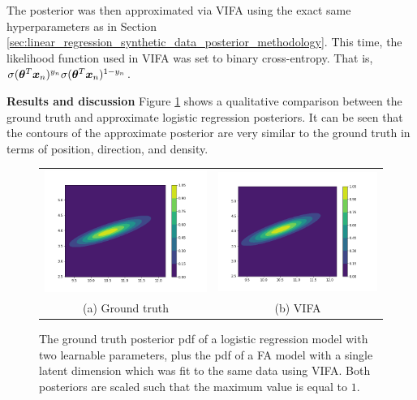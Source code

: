 \documentclass[10pt]{article} %
\begin{document}
The posterior was then approximated via VIFA using the exact same hyperparameters as in Section \ref{sec:linear_regression_synthetic_data_posterior_methodology}. This time, the likelihood function used in VIFA was set to binary cross-entropy. That is, $\sigma({\bm{\theta}}^T {\bm{x}}_n)^{y_n} \sigma({\bm{\theta}}^T {\bm{x}}_n)^{1 - y_n}$.


\textbf{Results and discussion} Figure \ref{fig:logistic_regression_synthetic_data_posterior} shows a qualitative comparison between the ground truth and approximate logistic regression posteriors. It can be seen that the contours of the approximate posterior are very similar to the ground truth in terms of position, direction, and density.
\begin{figure}[!htbp] 
\begin{center}
\begin{tabular}{cc}
	\includegraphics[width=70mm]{plots/logistic_regression_synthetic_true_posterior.png}
	& \includegraphics[width=70mm]{plots/logistic_regression_synthetic_vifa_posterior.png} \\
	(a) Ground truth
	& (b) VIFA \\[6pt]
\end{tabular}
\end{center}
\caption{The ground truth posterior pdf of a logistic regression model with two learnable parameters, plus the pdf of a FA model with a single latent dimension which was fit to the same data using VIFA. Both posteriors are scaled such that the maximum value is equal to $1$.}
\label{fig:logistic_regression_synthetic_data_posterior}
\end{figure}
\end{document}
